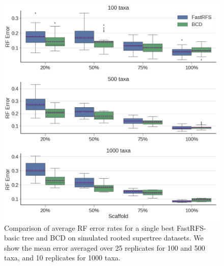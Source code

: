 \begin{figure}
  \centering
  \includegraphics[width=\textwidth]{siesta-supp-figs/fastrfs_basic_smidgenOG_error}
  \caption[Comparison of average RF error rates for a single best FastRFS-basic tree
    and BCD on simulated rooted supertree datasets.]{Comparison of average RF error rates for a single best FastRFS-basic tree
    and BCD on simulated rooted supertree datasets. We show the mean
    error averaged over 25 replicates for 100 and 500 taxa, and 10
    replicates for 1000 taxa.}
  \label{fig:supertree-consensus-comparison-5}
\end{figure}
\clearpage

